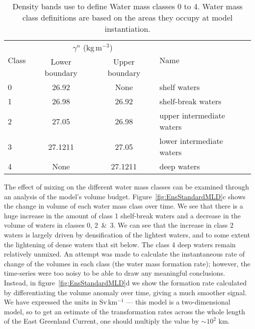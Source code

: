 \begin{table}[tp]
    \caption{Density bands use to define Water mass classes 0 to 4. Water mass class definitions are based on the areas they occupy at model instantiation.}
    \label{tab:Class}
    \begin{tabular}{lccl}
        \hline
    \multirow{2}{*}{Class} & \multicolumn{2}{c}{$\gamma^n$ (kg\,m$^{-3}$)}  & \multirow{2}{*}{Name}     \\
                           & Lower boundary & Upper boundary &                           \\ \hline \hline
    0                      & 26.92          & None           & shelf waters              \\
    1                      & 26.98          & 26.92          & shelf-break waters        \\
    2                      & 27.05          & 26.98          & upper intermediate waters \\
    3                      & 27.1211        & 27.05          & lower intermediate waters \\
    4                      & None           & 27.1211        & deep waters               \\ \hline
    \end{tabular}
\end{table}

The effect of mixing on the different water mass classes can be examined through an analysis of the model's volume budget. Figure~\ref{fig:EnsStandardMLD}c shows the change in volume of each water mass class over time. We see that there is a huge increase in the amount of class 1 shelf-break waters and a decrease in the volume of waters in classes 0, 2~\&~3. We can see that the increase in class 2 waters is largely driven by densification of the lightest waters, and to some extent the lightening of dense waters that sit below. The class 4 deep waters remain relatively unmixed. An attempt was made to calculate the instantaneous rate of change of the volumes in each class (the water mass formation rate); however, the time-series were too noisy to be able to draw any meaningful conclusions. Instead, in figure~\ref{fig:EnsStandardMLD}d we show the formation rate calculated by differentiating the volume anomaly over time, giving a much smoother signal. We have expressed the units in Sv\,km$^{-1}$ --- this model is a two-dimensional model, so to get an estimate of the transformation rates across the whole length of the East Greenland Current, one should multiply the value by $\sim 10^2$ km.

